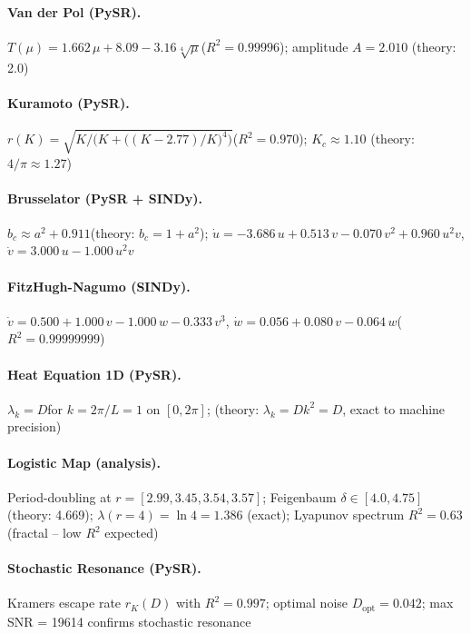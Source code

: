 \documentclass{article}
\begin{document}
\paragraph{Van der Pol (PySR).}
$T(\mu) = 1.662\,\mu + 8.09 - 3.16\sqrt[4]{\mu}$\quad ($R^2 = 0.99996$);\quad
amplitude $A = 2.010$ (theory: 2.0)

\paragraph{Kuramoto (PySR).}
$r(K) = \sqrt{K \big/ \big(K + \big((K - 2.77)/K\big)^4\big)}$\quad ($R^2 = 0.970$);\quad
$K_c \approx 1.10$ (theory: $4/\pi \approx 1.27$)

\paragraph{Brusselator (PySR + SINDy).}
$b_c \approx a^2 + 0.911$\quad (theory: $b_c = 1 + a^2$);\quad
$\dot{u} = -3.686\,u + 0.513\,v - 0.070\,v^2 + 0.960\,u^2 v$, \quad
$\dot{v} = 3.000\,u - 1.000\,u^2 v$

\paragraph{FitzHugh-Nagumo (SINDy).}
$\dot{v} = 0.500 + 1.000\,v - 1.000\,w - 0.333\,v^3$, \quad
$\dot{w} = 0.056 + 0.080\,v - 0.064\,w$\quad ($R^2 = 0.99999999$)

\paragraph{Heat Equation 1D (PySR).}
$\lambda_k = D$\quad for $k = 2\pi/L = 1$ on $[0, 2\pi]$;\quad
(theory: $\lambda_k = Dk^2 = D$, exact to machine precision)

\paragraph{Logistic Map (analysis).}
Period-doubling at $r = [2.99, 3.45, 3.54, 3.57]$;\quad
Feigenbaum $\delta \in [4.0, 4.75]$ (theory: 4.669);\quad
$\lambda(r{=}4) = \ln 4 = 1.386$ (exact);\quad
Lyapunov spectrum $R^2 = 0.63$ (fractal -- low $R^2$ expected)

\paragraph{Stochastic Resonance (PySR).}
Kramers escape rate $r_K(D)$ with $R^2 = 0.997$;\quad
optimal noise $D_\text{opt} = 0.042$;\quad
max SNR = 19614 confirms stochastic resonance
\end{document}
